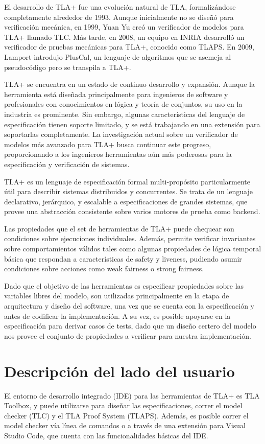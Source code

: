 \documentclass[runningheads]{llncs}
\begin{document}
El desarrollo de TLA+ fue una evolución natural de TLA, formalizándose completamente alrededor de 1993. Aunque inicialmente no se diseñó para verificación mecánica, en 1999, Yuan Yu creó un verificador de modelos para TLA+ llamado TLC. Más tarde, en 2008, un equipo en INRIA desarrolló un verificador de pruebas mecánicas para TLA+, conocido como TLAPS. En 2009, Lamport introdujo PlusCal, un lenguaje de algoritmos que se asemeja al pseudocódigo pero se transpila a TLA+.

TLA+ se encuentra en un estado de continuo desarrollo y expansión. Aunque la herramienta está diseñada principalmente para ingenieros de software y profesionales con conocimientos en lógica y teoría de conjuntos, su uso en la industria es prominente. Sin embargo, algunas características del lenguaje de especificación tienen soporte limitado, y se está trabajando en una extensión para soportarlas completamente. La investigación actual sobre un verificador de modelos más avanzado para TLA+ busca continuar este progreso, proporcionando a los ingenieros herramientas aún más poderosas para la especificación y verificación de sistemas.

TLA+ es un lenguaje de especificación formal multi-propósito particularmente útil para describir sistemas distribuidos y concurrentes. Se trata de un lenguaje declarativo, jerárquico, y escalable a especificaciones de grandes sistemas, que provee una abstracción consistente sobre varios motores de prueba como backend.

Las propiedades que el set de herramientas de TLA+ puede chequear son condiciones sobre ejecuciones individuales. Además, permite verificar invariantes sobre comportamientos válidos tales como algunas propiedades de lógica temporal básica que respondan a características de safety y liveness, pudiendo asumir condiciones sobre acciones como weak fairness o strong fairness.

Dado que el objetivo de las herramientas es especificar propiedades sobre las variables libres del modelo, son utilizadas principalmente en la etapa de arquitectura y diseño del software, una vez que se cuenta con la especificación y antes de codificar la implementación. A su vez, es posible apoyarse en la especificación para derivar casos de tests, dado que un diseño certero del modelo nos provee el conjunto de propiedades a verificar para nuestra implementación.

\section{Descripción del lado del usuario}
El entorno de desarrollo integrado (IDE) para las herramientas de TLA+ es TLA Toolbox, y puede utilizarse para diseñar las especificaciones, correr el model checker (TLC) y el TLA Proof System (TLAPS). Además, es posible correr el model checker vía línea de comandos o a través de una extensión para Visual Studio Code, que cuenta con las funcionalidades básicas del IDE.
\end{document}
